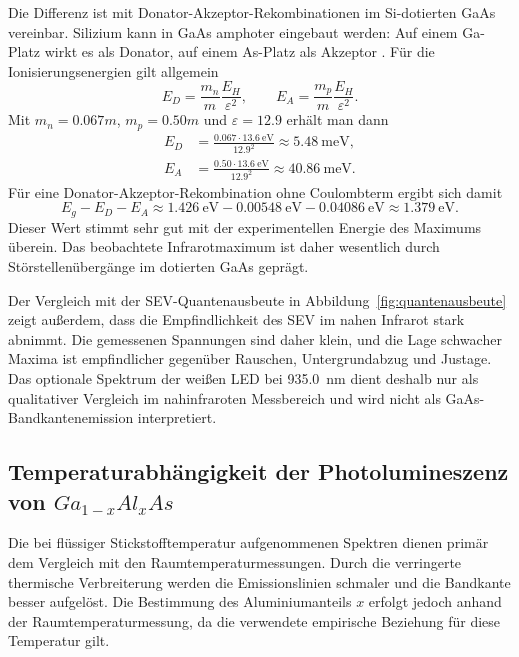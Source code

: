 \documentclass{article}
\begin{document}
Die Differenz ist mit Donator-Akzeptor-Rekombinationen im Si-dotierten GaAs vereinbar. Silizium kann in GaAs amphoter eingebaut werden: Auf einem Ga-Platz wirkt es als Donator, auf einem As-Platz als Akzeptor \cite[S.~18]{manual}. Für die Ionisierungsenergien gilt allgemein
\begin{equation}
    E_D = \frac{m_n}{m}\frac{E_H}{\varepsilon^2},
    \qquad
    E_A = \frac{m_p}{m}\frac{E_H}{\varepsilon^2}.
\end{equation}
Mit $m_n=0.067m$, $m_p=0.50m$ und $\varepsilon=12.9$ \cite[Tabelle~2]{manual} erhält man dann
\begin{align}
    E_D &= \frac{0.067\cdot\SI{13.6}{\electronvolt}}{12.9^2}
    \approx \SI{5.48}{\milli\electronvolt},\\
    E_A &= \frac{0.50\cdot\SI{13.6}{\electronvolt}}{12.9^2}
    \approx \SI{40.86}{\milli\electronvolt}.
\end{align}
Für eine Donator-Akzeptor-Rekombination ohne Coulombterm ergibt sich damit
\begin{equation}
    E_g-E_D-E_A
    \approx \SI{1.426}{\electronvolt}-\SI{0.00548}{\electronvolt}-\SI{0.04086}{\electronvolt}
    \approx \SI{1.379}{\electronvolt}.
\end{equation}
Dieser Wert stimmt sehr gut mit der experimentellen Energie des Maximums überein. Das beobachtete Infrarotmaximum ist daher wesentlich durch Störstellenübergänge im dotierten GaAs geprägt.

Der Vergleich mit der SEV-Quantenausbeute in Abbildung~\ref{fig:quantenausbeute} zeigt außerdem, dass die Empfindlichkeit des SEV im nahen Infrarot stark abnimmt. Die gemessenen Spannungen sind daher klein, und die Lage schwacher Maxima ist empfindlicher gegenüber Rauschen, Untergrundabzug und Justage. Das optionale Spektrum der weißen LED bei \SI{935.0}{\nano\meter} dient deshalb nur als qualitativer Vergleich im nahinfraroten Messbereich und wird nicht als GaAs-Bandkantenemission interpretiert.

\subsection{Temperaturabhängigkeit der Photolumineszenz von $Ga_{1-x}Al_xAs$}

Die bei flüssiger Stickstofftemperatur aufgenommenen Spektren dienen primär dem Vergleich mit den
Raumtemperaturmessungen. Durch die verringerte thermische Verbreiterung werden die Emissionslinien
schmaler und die Bandkante besser aufgelöst. Die Bestimmung des Aluminiumanteils $x$ erfolgt jedoch
anhand der Raumtemperaturmessung, da die verwendete empirische Beziehung für diese Temperatur gilt.
\end{document}
